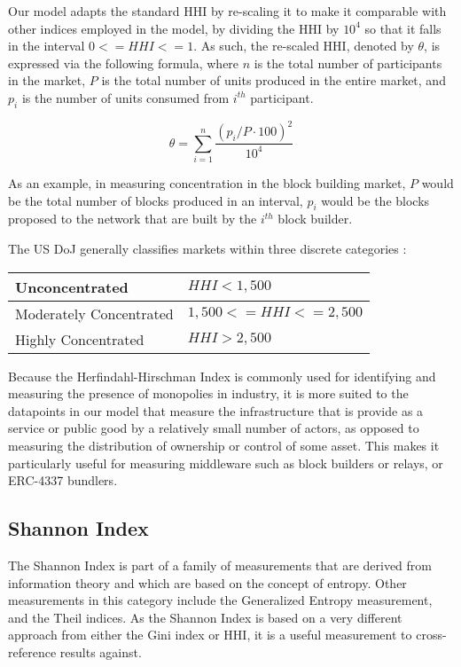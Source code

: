 \documentclass[conference]{IEEEtran}
\begin{document}
Our model adapts the standard HHI by re-scaling it to make it comparable with other indices employed in the model, by dividing the HHI by $10^4$ so that it falls in the interval $0 <= HHI <= 1$. As such, the re-scaled HHI, denoted by $\theta$, is expressed via the following formula, where $n$ is the total number of participants in the market, $P$ is the total number of units produced in the entire market, and $p_i$ is the number of units consumed from $i^{th}$ participant.

\[\theta = \sum_{i=1}^{n} \frac{(p_{i}/P \cdot 100)^{2}}{10^{4}}
\]

As an example, in measuring concentration in the block building market, $P$ would be the total number of blocks produced in an interval,  $p_i$ would be the blocks proposed to the network that are built by the $i^{th}$ block builder.

The US DoJ generally classifies markets within three discrete categories \cite{usdoj2015}:

\begin{center}
\begin{tabular}{|l|l|}
\hline
Unconcentrated & $HHI < 1,500$  \\ \hline
Moderately Concentrated & $1,500 <= HHI <= 2,500$ \\ \hline
Highly Concentrated & $HHI > 2,500$ \\ \hline
\end{tabular}
\end{center}

Because the Herfindahl-Hirschman Index is commonly used for identifying and measuring the presence of monopolies in industry, it is more suited to the datapoints in our model that measure the infrastructure that is provide as a service or public good by a relatively small number of actors, as opposed to measuring the distribution of ownership or control of some asset.  This makes it particularly useful for measuring middleware such as block builders or relays, or ERC-4337 bundlers.

\subsection{Shannon Index}

The Shannon Index \cite{shannon1998mathematical} is part of a family of measurements that are derived from information theory and which are based on the concept of entropy.  Other measurements in this category include the Generalized Entropy measurement, and the Theil indices.  As the Shannon Index is based on a very different approach from either the Gini index or HHI, it is a useful measurement to cross-reference results against.
\end{document}
